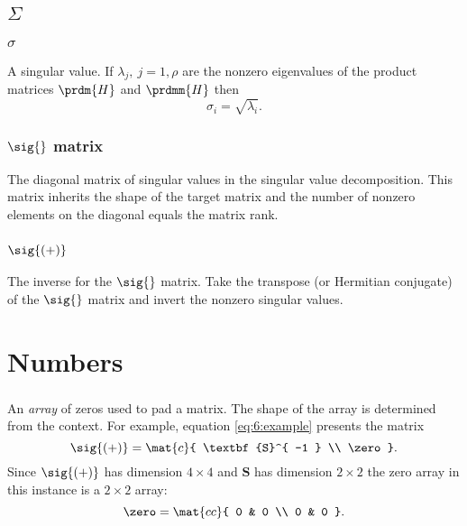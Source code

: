 \subsection*{$\Sigma$} 

\subsubsection*{$\sigma$}
A singular value. If $\lambda_j,\ j=1,\rho$ are the nonzero eigenvalues of the product matrices $\prdm{H}$ and $\prdmm{H}$ then
\begin{equation}
  \sigma_i = \sqrt{\lambda_i}.
\end{equation}

\subsubsection*{$\sig{}$ matrix}
The diagonal matrix of singular values in the singular value decomposition. This matrix inherits the shape of the target matrix and the number of nonzero elements on the diagonal equals the matrix rank.

\subsubsection*{$\sig{(+)}$}
The inverse for the $\sig{}$ matrix. Take the transpose (or Hermitian conjugate) of the $\sig{}$ matrix and invert the nonzero singular values.

\section*{Numbers} 

\subsubsection*{\zero}
An \textit{array} of zeros used to pad a matrix. The shape of the array is determined from the context. For example, equation \eqref{eq:6:example} presents the matrix
\begin{equation}
\sig{(+)} =
\mat{c}{
 \textbf{S}^{ -1 } \\
 \zero
 }.
\end{equation}
Since $\sig{(+)}$ has dimension $4 \times 4$ and $\textbf{S}$ has dimension $2 \times 2$ the zero array in this instance is a $2 \times 2$ array:
\begin{equation}
  \zero = 
  \mat{cc}{
  0 & 0 \\
  0 & 0
  }.
\end{equation}

